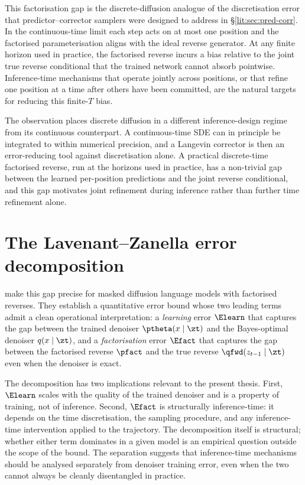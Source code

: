 This factorisation gap is the discrete-diffusion analogue of the
discretisation error that predictor--corrector samplers were designed to
address in \S\ref{lit:sec:pred-corr}. In the continuous-time limit each
step acts on at most one position and the factorised parameterisation
aligns with the ideal reverse generator. At any finite horizon used in
practice, the factorised reverse incurs a bias relative to the joint
true reverse conditional that the trained network cannot absorb
pointwise. Inference-time mechanisms that operate jointly across
positions, or that refine one position at a time after others have been
committed, are the natural targets for reducing this finite-$T$ bias.

The observation places discrete diffusion in a different inference-design
regime from its continuous counterpart. A continuous-time SDE can in
principle be integrated to within numerical precision, and a Langevin
corrector is then an error-reducing tool against discretisation alone. A
practical discrete-time factorised reverse, run at the horizons used in
practice, has a non-trivial gap between the learned per-position
predictions and the joint reverse conditional, and this gap motivates
joint refinement during inference rather than further time refinement
alone.

\section{The Lavenant--Zanella error decomposition}
\label{lit:sec:lz}

\textcite{lavenant2025lz} make this gap precise for masked diffusion language
models with factorised reverses. They establish a quantitative error bound
whose two leading terms admit a clean operational interpretation: a
\emph{learning} error $\Elearn$ that captures the gap between the trained
denoiser $\ptheta(x\mid \zt)$ and the Bayes-optimal denoiser
$q(x\mid \zt)$, and a \emph{factorisation} error $\Efact$ that captures
the gap between the factorised reverse $\pfact$ and the true reverse
$\qfwd(z_{t-1}\mid \zt)$ even when the denoiser is exact.

The decomposition has two implications relevant to the present thesis.
First, $\Elearn$ scales with the quality of the trained denoiser and is a
property of training, not of inference. Second, $\Efact$ is structurally
inference-time: it depends on the time discretisation, the sampling
procedure, and any inference-time intervention applied to the trajectory.
The decomposition itself is structural; whether either term dominates in
a given model is an empirical question outside the scope of the bound.
The separation suggests that inference-time mechanisms should be analysed
separately from denoiser training error, even when the two cannot always
be cleanly disentangled in practice.

